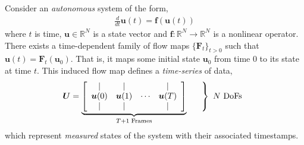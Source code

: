 Consider an \emph{autonomous} system of the form,
\begin{align}
    \label{eqn:autonomous}
    \frac{d}{dt}\bm{u}(t) = \bm{f}(\bm{u}(t))
\end{align}
where $t$ is time, $\bm{u} \in \mathbb{R}^N$ is a state vector and $\bm{f}:\mathbb{R}^N\to \mathbb{R}^N$ is a nonlinear operator. There exists a time-dependent family of flow maps $\{\bm{F}_t\}_{t>0}$ such that $\bm{u}(t)=\bm{F}_t(\bm{u}_0)$. That is, it maps some initial state $\bm{u}_0$ from time $0$ to its state at time $t$. This induced flow map defines a \emph{time-series} of data,
\begin{equation}
    \label{eqn:data_matrix}
    \bm{U} =
    \underbrace{\left[
    \begin{array}{c c c c c}
        \vert & \vert &        & \vert \\
        \bm{u}(0) & \bm{u}(1) & \cdots & \bm{u}(T) \\
        \vert & \vert &        & \vert \\
    \end{array}
    \right]
    }_{T+1 \;\text{Frames}}
    \begin{array}{l}
        \left.\begin{array}{c} \\ \\ \\ \end{array}\right\}
        \text{ $N$ DoFs}
    \end{array}
\end{equation}
which represent \emph{measured} states of the system with their associated timestamps.

